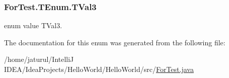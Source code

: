 \subsubsection[{T\+Val3}]{\setlength{\rightskip}{0pt plus 5cm}For\+Test.\+T\+Enum.\+T\+Val3}\label{enum_for_test_1_1_t_enum_a915448ba9d75f837e89122758dd4ad66}
enum value T\+Val3. 

The documentation for this enum was generated from the following file\+:\begin{DoxyCompactItemize}
\item 
/home/jaturul/\+Intelli\+J I\+D\+E\+A/\+Idea\+Projects/\+Hello\+World/\+Hello\+World/src/\hyperlink{_for_test_8java}{For\+Test.\+java}\end{DoxyCompactItemize}
